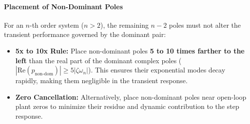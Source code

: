 \documentclass[12pt,onecolumn,twoside ]{article}
\begin{document}
	\paragraph{Placement of Non-Dominant Poles}
	For an $n$-th order system ($n > 2$), the remaining $n - 2$ poles must not alter the transient performance governed by the dominant pair:
	\begin{itemize}
		\item
		\textbf{5x to 10x Rule:} Place non-dominant poles \textbf{5 to 10 times farther to the left} than the real part of the dominant complex poles ($|\text{Re}(p_{\text{non-dom}})| \ge 5 |\zeta \omega_n|$). This ensures their exponential modes decay rapidly, making them negligible in the transient response.
		\item
		\textbf{Zero Cancellation:} Alternatively, place non-dominant poles near open-loop plant zeros to minimize their residue and dynamic contribution to the step response.
	\end{itemize}
	
\end{document}
